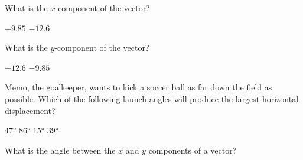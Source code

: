 \documentclass[../main-physics-workbook.tex]{subfiles}
\begin{document}
\begin{questions}
\question
What is the $x$-component of the vector?

\begin{choices}
    \choice $-9.85$
    \correctchoice $-12.6$
\end{choices}

\question
What is the $y$-component of the vector?

\begin{choices}
    \choice $-12.6$
    \choice $-9.85$
\end{choices}

\question
Memo, the goalkeeper, wants to kick a soccer ball as far down the field as possible. Which of the following launch angles will produce the largest horizontal displacement?

\begin{minipage}{6cm}
\centering
    \begin{randomizechoices}
        \correctchoice \ang{47}
        \choice \ang{86}
        \choice \ang{15}
        \choice \ang{39}
    \end{randomizechoices}
\end{minipage}%
\begin{minipage}{6cm}
    \begin{center}
        \label{i1Y7vV}
    \end{center}
\end{minipage}

\question
What is the angle between the $x$ and $y$ components of a vector?


\end{questions}
\end{document}
